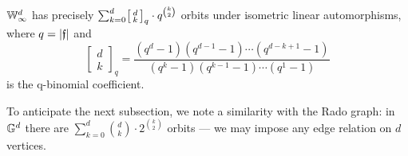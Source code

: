 \begin{proposition}\label{prop:symplectic-oligomorphic}
    $\mathbb{W}_\infty^d$ has precisely \(
        \sum_{k = 0}^d \begin{bsmallmatrix}d \\ k \end{bsmallmatrix}_q \cdot q^{\binom{k}{2}}
    \) orbits under isometric linear automorphisms,
    where $q = \vert \mathfrak{f} \vert$ and \[
        \begin{bmatrix}d \\ k \end{bmatrix}_q 
        = \frac{
            (q^d - 1)(q^{d-1} - 1) \cdots (q^{d-k+1} - 1)
        }{
            (q^k - 1) (q^{k-1} - 1) \cdots (q^1 - 1)
        }
    \] is the q-binomial coefficient.
\end{proposition}
\begin{remark}
    To anticipate the next subsection, we note a similarity with the Rado graph: 
    in $\mathbb{G}^d$ there are $\sum_{k=0}^d \binom{d}{k} \cdot 2^{\binom{k}{2}}$ orbits 
    --- we may impose any edge relation on $d$ vertices.
\end{remark}

